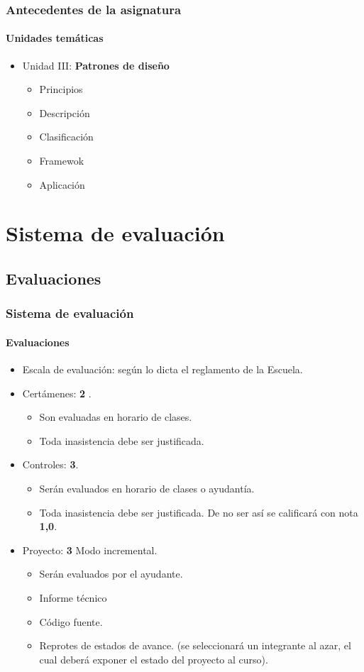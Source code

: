 \documentclass{beamer}
\begin{document}
		\begin{frame}
			\frametitle{Antecedentes de la asignatura}
			\framesubtitle{Unidades tem\'aticas}

			\begin{itemize}
				\item Unidad III: \textbf{Patrones de dise\~no}
				\begin{itemize}
					\item Principios
					\item Descripci\'on 
					\item Clasificaci\'on
					\item Framewok
					\item Aplicaci\'on
				\end{itemize}
			\end{itemize}
		\end{frame}

	\section{Sistema de evaluaci\'on}

		\subsection{Evaluaciones}

		\begin{frame}
			\frametitle{Sistema de evaluaci\'on}
			\framesubtitle{Evaluaciones}

			\begin{itemize}
				\item Escala de evaluaci\'on: seg\'un lo dicta el reglamento de la Escuela.
				\item Cert\'amenes: \textbf{2} .
				\begin{itemize}
					\item Son evaluadas en horario de clases.
					\item Toda inasistencia debe ser justificada.
				\end{itemize}
				\item Controles: \textbf{3}. 
				\begin{itemize}
					\item Ser\'an evaluados en horario de clases o ayudant\'ia.
					\item Toda inasistencia debe ser justificada. De no ser as\'i se calificar\'a con nota \textbf{1,0}.
				\end{itemize}
				\item Proyecto: \textbf{3} Modo incremental.
				\begin{itemize}
				    \item Ser\'an evaluados por el ayudante.
					\item Informe t\'ecnico 
					\item C\'odigo fuente.
					\item Reprotes de estados de avance. (se seleccionar\'a un integrante al azar, el cual deberá exponer el estado del proyecto al curso).
				\end{itemize}
			\end{itemize}
		\end{frame}
		
\end{document}
